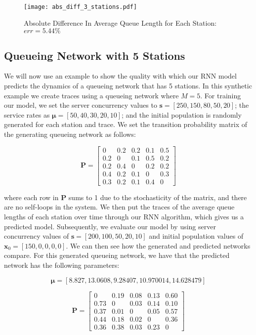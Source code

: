 \documentclass[a4paper,11pt,titlepage]{article}
\begin{document}
\begin{figure}[h!]
\begin{center}
\texttt{[image: abs\_diff\_3\_stations.pdf]}
\caption{Absolute Difference In Average Queue Length for Each Station: $err = 5.44\%$}
\label{fig:abs_diff_queue}
\end{center}
\end{figure}

\subsection{Queueing Network with 5 Stations}

We will now use an example to show the quality with which our RNN model predicts the dynamics of a queueing network that has 5 stations. In this synthetic example we create traces using a queueing network where $M=5$. For training our model, we set the server concurrency values to $\mathbf{s} = [250, 150, 80,50,20]$; the service rates as $\bm{\mu} = [50,40,30,20,10]$; and the initial population is randomly generated for each station and trace. We set the transition probability matrix of the generating queueing network as follows: 

$$\mathbf{P} = \begin{bmatrix}
0 & 0.2 & 0.2 & 0.1 & 0.5\\
0.2 & 0 & 0.1 & 0.5 & 0.2\\
0.2 & 0.4 & 0 & 0.2 & 0.2\\
0.4 & 0.2 & 0.1 & 0 & 0.3\\
0.3 & 0.2 & 0.1 & 0.4 & 0
\end{bmatrix} $$

where each row in $\mathbf{P}$ sums to 1 due to the stochasticity of the matrix, and there are no self-loops in the system. We then put the traces of the average queue lengths of each station over time through our RNN algorithm, which gives us a predicted model. Subsequently, we evaluate our model by using server concurrency values of $\mathbf{s} = [200, 100, 50,20,10]$ and initial population values of $ \mathbf{x}_0 = [150,0,0,0,0]$. We can then see how the generated and predicted networks compare. For this generated queueing network, we have that the predicted network has the following parameters: 

$$ \bm{\mu} = [8.827,13.0608,9.28407,10.970014,14.628479] $$

$$\mathbf{P} = \begin{bmatrix}
0 & 0.19 & 0.08 & 0.13 & 0.60\\
0.73 & 0 & 0.03 & 0.14 & 0.10\\
0.37 & 0.01 & 0 & 0.05 & 0.57\\
0.44 & 0.18 & 0.02 & 0 & 0.36\\
0.36 & 0.38 & 0.03 & 0.23 & 0
\end{bmatrix} $$ \\
\end{document}

